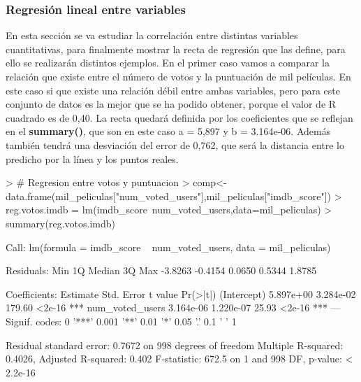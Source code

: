 \documentclass[a4paper]{article}
\begin{document}
\subsubsection{Regresión lineal entre variables}
En esta sección se va estudiar la correlación entre distintas variables cuantitativas, para finalmente mostrar la recta de regresión que las define, para ello se realizarán distintos ejemplos.
En el primer caso vamos a comparar la relación que existe entre el número de votos y la puntuación de mil películas. En este caso si que existe una relación débil entre ambas variables, pero para este conjunto de datos es la mejor que se ha podido obtener, porque el valor de R cuadrado es de 0,40. La recta quedará definida por los coeficientes que se reflejan en el \textbf{summary()}, que son en este caso a = 5,897 y b =  3.164e-06. Además también tendrá una desviación del error de 0,762, que será la distancia entre lo predicho por la línea y los puntos reales.
\begin{Schunk}
\begin{Sinput}
> # Regresion entre votos y puntuacion
> comp<-data.frame(mil_peliculas["num_voted_users"],mil_peliculas["imdb_score"])
> reg.votos.imdb = lm(imdb_score~num_voted_users,data=mil_peliculas)
> summary(reg.votos.imdb)
\end{Sinput}
\begin{Soutput}
Call:
lm(formula = imdb_score ~ num_voted_users, data = mil_peliculas)

Residuals:
    Min      1Q  Median      3Q     Max 
-3.8263 -0.4154  0.0650  0.5344  1.8785 

Coefficients:
                 Estimate Std. Error t value Pr(>|t|)    
(Intercept)     5.897e+00  3.284e-02  179.60   <2e-16 ***
num_voted_users 3.164e-06  1.220e-07   25.93   <2e-16 ***
---
Signif. codes:  0 '***' 0.001 '**' 0.01 '*' 0.05 '.' 0.1 ' ' 1

Residual standard error: 0.7672 on 998 degrees of freedom
Multiple R-squared:  0.4026,	Adjusted R-squared:  0.402 
F-statistic: 672.5 on 1 and 998 DF,  p-value: < 2.2e-16
\end{Soutput}
\end{Schunk}
\end{document}
